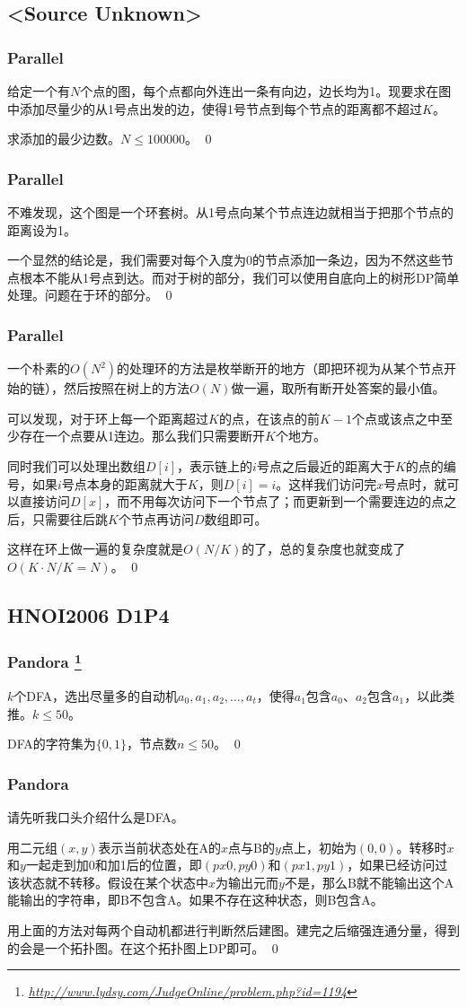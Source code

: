 \documentclass[9pt,dvipsnames,table]{beamer}
\newcommand{\hlink}[1]{
	\footnote{\fontsize{6pt}{\baselineskip}\href{#1}{\textsl{\underline{\url{#1}}}}}
}
\newenvironment{qedframe}{%
	\begin{frame}[environment=qedqedframe]%
	}{%
	\qed
	\end{frame}%
}
\begin{document}
\subsection{<Source Unknown>}
\begin{qedframe}
	\frametitle{Parallel}
	给定一个有$N$个点的图，每个点都向外连出一条有向边，边长均为1。现要求在图中添加尽量少的从1号点出发的边，使得1号节点到每个节点的距离都不超过$K$。
	
	求添加的最少边数。$N\leq 100000$。
\end{qedframe}
\begin{qedframe}
	\frametitle{Parallel}
	不难发现，这个图是一个环套树。从1号点向某个节点连边就相当于把那个节点的距离设为1。\pause
	
	一个显然的结论是，我们需要对每个入度为0的节点添加一条边，因为不然这些节点根本不能从1号点到达。而对于树的部分，我们可以使用自底向上的树形DP简单处理。问题在于环的部分。
\end{qedframe}
\begin{qedframe}
	\frametitle{Parallel}
	一个朴素的$O(N^2)$的处理环的方法是枚举断开的地方（即把环视为从某个节点开始的链），然后按照在树上的方法$O(N)$做一遍，取所有断开处答案的最小值。\pause
	
	可以发现，对于环上每一个距离超过$K$的点，在该点的前$K-1$个点或该点之中至少存在一个点要从1连边。那么我们只需要断开$K$个地方。\pause
	
	同时我们可以处理出数组$D[i]$，表示链上的$i$号点之后最近的距离大于$K$的点的编号，如果$i$号点本身的距离就大于$K$，则$D[i]=i$。这样我们访问完$x$号点时，就可以直接访问$D[x]$，而不用每次访问下一个节点了；而更新到一个需要连边的点之后，只需要往后跳$K$个节点再访问$D$数组即可。
	
	这样在环上做一遍的复杂度就是$O(N/K)$的了，总的复杂度也就变成了$O(K\cdot N/K = N)$。
\end{qedframe}

\subsection{HNOI2006 D1P4}
\begin{qedframe}
	\frametitle{Pandora\hlink{http://www.lydsy.com/JudgeOnline/problem.php?id=1194}}
	$k$个DFA，选出尽量多的自动机$a_0,a_1,a_2,\ldots,a_t$，使得$a_1$包含$a_0$、$a_2$包含$a_1$，以此类推。$k\leq 50$。
	
	DFA的字符集为$\{0,1\}$，节点数$n\leq 50$。
\end{qedframe}
\begin{qedframe}
	\frametitle{Pandora}
	请先听我口头介绍什么是DFA。\pause
	
	用二元组$(x,y)$表示当前状态处在A的$x$点与B的$y$点上，初始为$(0,0)$。转移时$x$和$y$一起走到加0和加1后的位置，即$(px0,py0)$和$(px1,py1)$，如果已经访问过该状态就不转移。假设在某个状态中$x$为输出元而$y$不是，那么B就不能输出这个A能输出的字符串，即B不包含A。如果不存在这种状态，则B包含A。\pause
	
	用上面的方法对每两个自动机都进行判断然后建图。建完之后缩强连通分量，得到的会是一个拓扑图。在这个拓扑图上DP即可。
\end{qedframe}
\end{document}
